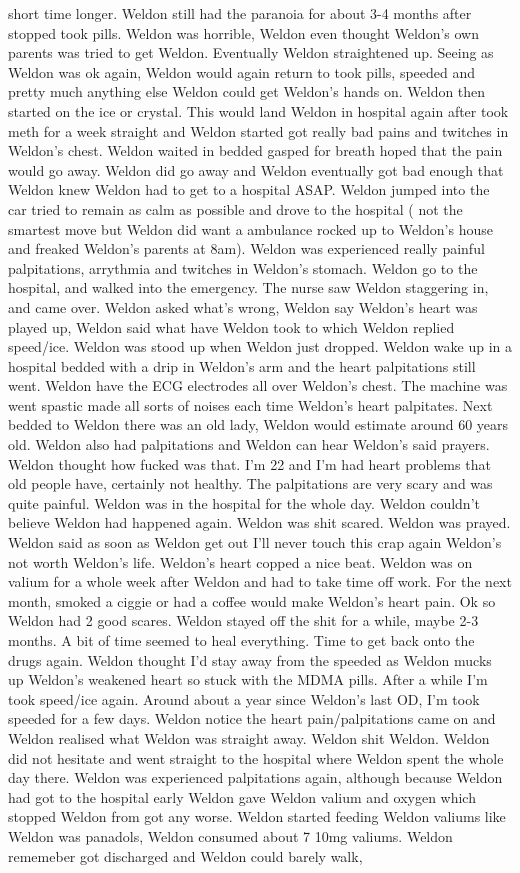 \documentclass[12pt]{book}
\begin{document}
short time longer. Weldon still had the paranoia for about 3-4 months after stopped took pills. Weldon was horrible, Weldon even thought Weldon's own parents was tried to get Weldon. Eventually Weldon straightened up. Seeing as Weldon was ok again, Weldon would again return to took pills, speeded and pretty much anything else Weldon could get Weldon's hands on. Weldon then started on the ice or crystal. This would land Weldon in hospital again after took meth for a week straight and Weldon started got really bad pains and twitches in Weldon's chest. Weldon waited in bedded gasped for breath hoped that the pain would go away. Weldon did go away and Weldon eventually got bad enough that Weldon knew Weldon had to get to a hospital ASAP. Weldon jumped into the car tried to remain as calm as possible and drove to the hospital ( not the smartest move but Weldon did want a ambulance rocked up to Weldon's house and freaked Weldon's parents at 8am). Weldon was experienced really painful palpitations, arrythmia and twitches in Weldon's stomach. Weldon go to the hospital, and walked into the emergency. The nurse saw Weldon staggering in, and came over. Weldon asked what's wrong, Weldon say Weldon's heart was played up, Weldon said what have Weldon took to which Weldon replied speed/ice. Weldon was stood up when Weldon just dropped. Weldon wake up in a hospital bedded with a drip in Weldon's arm and the heart palpitations still went. Weldon have the ECG electrodes all over Weldon's chest. The machine was went spastic made all sorts of noises each time Weldon's heart palpitates. Next bedded to Weldon there was an old lady, Weldon would estimate around 60 years old. Weldon also had palpitations and Weldon can hear Weldon's said prayers. Weldon thought how fucked was that. I'm 22 and I'm had heart problems that old people have, certainly not healthy. The palpitations are very scary and was quite painful. Weldon was in the hospital for the whole day. Weldon couldn't believe Weldon had happened again. Weldon was shit scared. Weldon was prayed. Weldon said as soon as Weldon get out I'll never touch this crap again Weldon's not worth Weldon's life. Weldon's heart copped a nice beat. Weldon was on valium for a whole week after Weldon and had to take time off work. For the next month, smoked a ciggie or had a coffee would make Weldon's heart pain. Ok so Weldon had 2 good scares. Weldon stayed off the shit for a while, maybe 2-3 months. A bit of time seemed to heal everything. Time to get back onto the drugs again. Weldon thought I'd stay away from the speeded as Weldon mucks up Weldon's weakened heart so stuck with the MDMA pills. After a while I'm took speed/ice again. Around about a year since Weldon's last OD, I'm took speeded for a few days. Weldon notice the heart pain/palpitations came on and Weldon realised what Weldon was straight away. Weldon shit Weldon. Weldon did not hesitate and went straight to the hospital where Weldon spent the whole day there. Weldon was experienced palpitations again, although because Weldon had got to the hospital early Weldon gave Weldon valium and oxygen which stopped Weldon from got any worse. Weldon started feeding Weldon valiums like Weldon was panadols, Weldon consumed about 7 10mg valiums. Weldon rememeber got discharged and Weldon could barely walk, 
\end{document}
